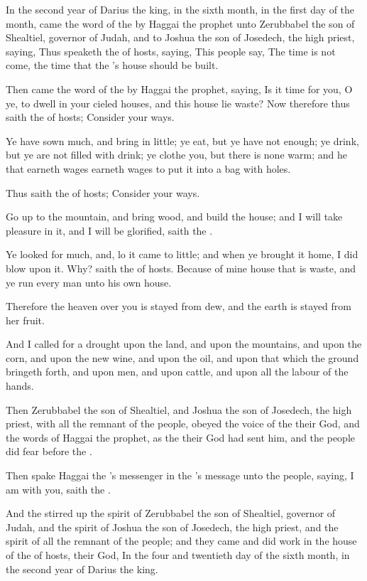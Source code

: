 


\Chapter
\Verse In the second year of Darius the king, in the sixth month, in the first day of the month, came the word of the \LORD by Haggai the prophet unto Zerubbabel the son of Shealtiel, governor of Judah, and to Joshua the son of Josedech, the high priest, saying, \Verse Thus speaketh the \LORD of hosts, saying, This people say, The time is not come, the time that the \LORD's house should be built.

\Verse Then came the word of the \LORD by Haggai the prophet, saying, \Verse Is it time for you, O ye, to dwell in your cieled houses, and this house lie waste?  \Verse Now therefore thus saith the \LORD of hosts; Consider your ways.

\Verse Ye have sown much, and bring in little; ye eat, but ye have not enough; ye drink, but ye are not filled with drink; ye clothe you, but there is none warm; and he that earneth wages earneth wages to put it into a bag with holes.

\Verse Thus saith the \LORD of hosts; Consider your ways.

\Verse Go up to the mountain, and bring wood, and build the house; and I will take pleasure in it, and I will be glorified, saith the \LORD.

\Verse Ye looked for much, and, lo it came to little; and when ye brought it home, I did blow upon it. Why? saith the \LORD of hosts. Because of mine house that is waste, and ye run every man unto his own house.

\Verse Therefore the heaven over you is stayed from dew, and the earth is stayed from her fruit.

\Verse And I called for a drought upon the land, and upon the mountains, and upon the corn, and upon the new wine, and upon the oil, and upon that which the ground bringeth forth, and upon men, and upon cattle, and upon all the labour of the hands.

\Verse Then Zerubbabel the son of Shealtiel, and Joshua the son of Josedech, the high priest, with all the remnant of the people, obeyed the voice of the \LORD their God, and the words of Haggai the prophet, as the \LORD their God had sent him, and the people did fear before the \LORD.

\Verse Then spake Haggai the \LORD's messenger in the \LORD's message unto the people, saying, I am with you, saith the \LORD.

\Verse And the \LORD stirred up the spirit of Zerubbabel the son of Shealtiel, governor of Judah, and the spirit of Joshua the son of Josedech, the high priest, and the spirit of all the remnant of the people; and they came and did work in the house of the \LORD of hosts, their God, \Verse In the four and twentieth day of the sixth month, in the second year of Darius the king.


